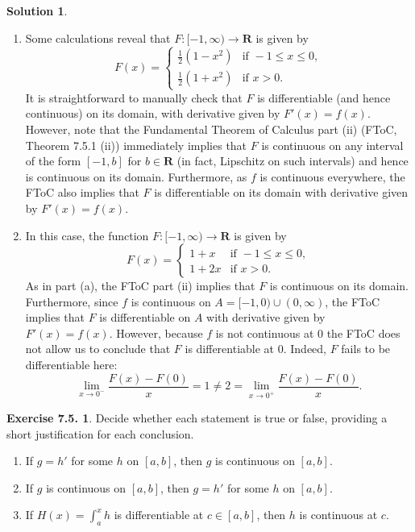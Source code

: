 \documentclass[12pt]{article}
\theoremstyle{definition}
\theoremstyle{exercise}
\newtheorem{exercise}{Exercise 7.5.}
\theoremstyle{solution}
\newtheorem*{solution}{Solution}
\newcommand{\R}{\mathbf{R}}
\begin{document}
\begin{solution}
    \begin{enumerate}
        \item Some calculations reveal that \( F : [-1, \infty) \to \R \) is given by
        \[
            F(x) = \begin{cases}
                \tfrac{1}{2} (1 - x^2) & \text{if } -1 \leq x \leq 0, \\
                \tfrac{1}{2} (1 + x^2) & \text{if } x > 0.
            \end{cases}
        \]
        It is straightforward to manually check that \( F \) is differentiable (and hence continuous) on its domain, with derivative given by \( F'(x) = f(x) \). However, note that the Fundamental Theorem of Calculus part (ii) (FToC, Theorem 7.5.1 (ii)) immediately implies that \( F \) is continuous on any interval of the form \( [-1, b] \) for \( b \in \R \) (in fact, Lipschitz on such intervals) and hence is continuous on its domain. Furthermore, as \( f \) is continuous everywhere, the FToC also implies that \( F \) is differentiable on its domain with derivative given by \( F'(x) = f(x) \).

        \item In this case, the function \( F : [-1, \infty) \to \R \) is given by
        \[
            F(x) = \begin{cases}
                1 + x & \text{if } -1 \leq x \leq 0, \\
                1 + 2x & \text{if } x > 0.
            \end{cases}
        \]
        As in part (a), the FToC part (ii) implies that \( F \) is continuous on its domain. Furthermore, since \( f \) is continuous on \( A = [-1, 0) \cup (0, \infty) \), the FToC implies that \( F \) is differentiable on \( A \) with derivative given by \( F'(x) = f(x) \). However, because \( f \) is not continuous at 0 the FToC does not allow us to conclude that \( F \) is differentiable at 0. Indeed, \( F \) fails to be differentiable here:
        \[
            \lim_{x \to 0^-} \frac{F(x) - F(0)}{x} = 1 \neq 2 = \lim_{x \to 0^+} \frac{F(x) - F(0)}{x}.
        \]
    \end{enumerate}
\end{solution}

\begin{exercise}
\label{ex:2}
    Decide whether each statement is true or false, providing a short justification for each conclusion.
    \begin{enumerate}
        \item If \( g = h' \) for some \( h \) on \( [a, b] \), then \( g \) is continuous on \( [a, b] \).

        \item If \( g \) is continuous on \( [a, b] \), then \( g = h' \) for some \( h \) on \( [a, b] \).

        \item If \( H(x) = \int_a^x h \) is differentiable at \( c \in [a, b] \), then \( h \) is continuous at \( c \).
    \end{enumerate}
\end{exercise}
\end{document}

